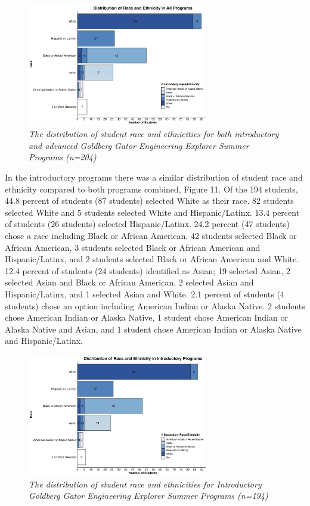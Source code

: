\documentclass[
]{article}
\begin{document}
\begin{figure}
\centering
\includegraphics[width=0.7\textwidth,height=\textheight]{Graphs/Report/GGEE_23_Race_All_Num.jpg}
\caption{\emph{The distribution of student race and ethnicities for both
introductory and advanced Goldberg Gator Engineering Explorer Summer
Programs (n=204)}}
\end{figure}

In the introductory programs there was a similar distribution of student
race and ethnicity compared to both programs combined, Figure 11. Of the
194 students, 44.8 percent of students (87 students) selected White as
their race. 82 students selected White and 5 students selected White and
Hispanic/Latinx. 13.4 percent of students (26 students) selected
Hispanic/Latinx. 24.2 percent (47 students) chose a race including Black
or African American. 42 students selected Black or African American, 3
students selected Black or African American and Hispanic/Latinx, and 2
students selected Black or African American and White. 12.4 percent of
students (24 students) identified as Asian; 19 selected Asian, 2
selected Asian and Black or African American, 2 selected Asian and
Hispanic/Latinx, and 1 selected Asian and White. 2.1 percent of students
(4 students) chose an option including American Indian or Alaska Native.
2 students chose American Indian or Alaska Native, 1 student chose
American Indian or Alaska Native and Asian, and 1 student chose American
Indian or Alaska Native and Hispanic/Latinx.

\begin{figure}
\centering
\includegraphics[width=0.7\textwidth,height=\textheight]{Graphs/Report/GGEE_23_Race_In_Num.jpg}
\caption{\emph{The distribution of student race and ethnicities for
Introductory Goldberg Gator Engineering Explorer Summer Programs
(n=194)}}
\end{figure}
\end{document}
